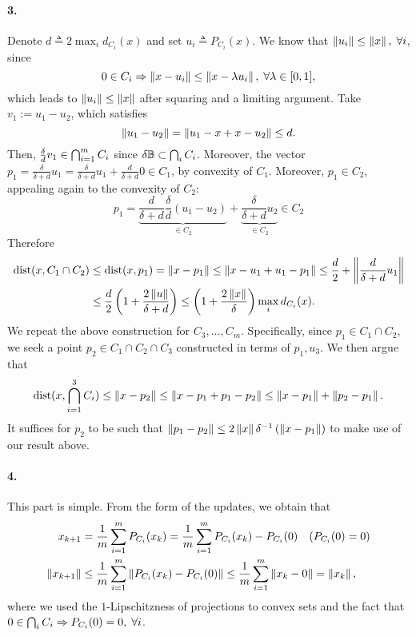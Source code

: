 \documentclass[10pt]{article}
\begin{document}
\paragraph{3.}
Denote $d \triangleq 2 \max_i d_{C_i}(x)$ and set $u_i \triangleq P_{C_i}(x)$.
We know that $\left \| u_i \right \| \leq \left \| x \right \|, \; \forall i$, since
\[
    0 \in C_i \Rightarrow
    \left \| x - u_i \right \| \leq \left \| x - \lambda u_i \right \|, \; \forall \lambda \in [0, 1],
\]
which leads to $\left \| u_i \right \| \leq \left \| x \right \|$ after squaring and a limiting
argument. Take $v_1 := u_1 - u_2$, which satisfies
\[
    \left \| u_1 - u_2 \right \| = \left \| u_1 - x + x - u_2 \right \| \leq d.
\]
Then, $\frac{\delta}{d} v_1 \in \operatorname*{\bigcap}_{i=1}^m C_i$ since $\delta \mathbb{B} 
\subset \operatorname*{\bigcap}_i C_i$. Moreover, the vector $p_1 = \frac{\delta}{\delta + d} u_1 
= \frac{\delta}{\delta + d} u_1 + \frac{d}{\delta + d} 0 \in C_1$, by convexity
of $C_1$. Moreover, $p_1 \in C_2$, appealing again to the convexity of $C_2$:
\[
    p_1 = \underbrace{\frac{d}{\delta + d} \frac{\delta}{d} (u_1 - u_2)}_{\in 
    C_2} + \underbrace{\frac{\delta}{\delta + d} u_2}_{\in C_2} \in C_2
\]
Therefore
\begin{align*}
    \mathrm{dist}(x, C_1 \cap C_2) &\leq \mathrm{dist}(x, p_1)
    = \left \| x - p_1 \right \| \leq \left \| x - u_1 + u_1 - p_1 \right \| \leq \frac{d}{2}
    + \left \| \frac{d}{\delta + d} u_1 \right \| \\
    &\leq \frac{d}{2} \left(1 + \frac{2 \left \| u \right \|}{\delta + d}\right)
     \leq \left(1 + \frac{2 \left \| x \right \|}{\delta}\right) \max_i d_{C_i}(x).
\end{align*}
We repeat the above construction for $C_3, \dots, C_m$. Specifically, since
$p_1 \in C_1 \cap C_2$, we seek a point $p_2 \in C_1 \cap C_2 \cap C_3$ 
constructed in terms of $p_1, u_3$. We then argue that
\[
    \mathrm{dist}(x, \operatorname*{\bigcap}_{i=1}^3 C_i) \leq \left \| x - p_2 \right \| \leq
    \left \| x - p_1 + p_1 - p_2 \right \| \leq \left \| x - p_1 \right \| + \left \| p_2 - p_1 \right \|.
\]
It suffices for $p_2$ to be such that $\left \| p_1 - p_2 \right \| \leq 2 \left \| x \right \| 
\delta^{-1} \left( \left \| x - p_1 \right \| \right)$ to make use of our result above.

\paragraph{4.}
This part is simple. From the form of the updates, we obtain that
\begin{align*}
    x_{k+1} &= \frac{1}{m} \sum_{i=1}^m P_{C_i}(x_k) =
        \frac{1}{m} \sum_{i=1}^m P_{C_i}(x_k) - P_{C_i}(0) \quad (P_{C_i}(0) = 
        0) \\
    \left \| x_{k+1} \right \| &\leq \frac{1}{m} \sum_{i=1}^m \left \| P_{C_i}(x_k) - 
    P_{C_i}(0) \right \| \leq \frac{1}{m} \sum_{i=1}^m \left \| x_k - 0 \right \| = \left \| x_k \right \|,
\end{align*}
where we used the $1$-Lipschitzness of projections to convex sets and the fact
that $0 \in \operatorname*{\bigcap}_i C_i \Rightarrow P_{C_i}(0) = 0, \; \forall i$.
\end{document}
